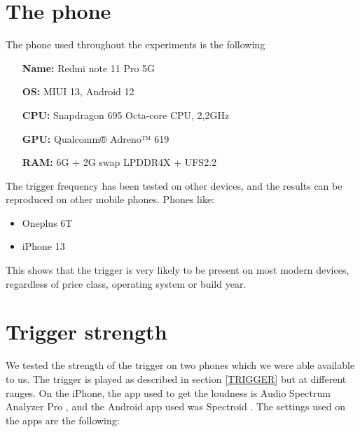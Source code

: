 \documentclass{report}
\theoremstyle{definition}
\theoremstyle{remark}
\begin{document}
\section{The phone}
The phone used throughout the experiments is the following \cite{REDMI}
\begin{center}
    \begin{varwidth}{\textwidth}
        \begin{itemize}
            \item[\textbf{Name:}] Redmi note 11 Pro 5G
            \item[\textbf{OS:}] MIUI 13, Android 12
            \item[\textbf{CPU:}] Snapdragon 695 Octa-core CPU, 2,2GHz
            \item[\textbf{GPU:}] Qualcomm® Adreno™ 619
            \item[\textbf{RAM:}] 6G + 2G swap LPDDR4X + UFS2.2
        \end{itemize}
    \end{varwidth}
\end{center}

The trigger frequency has been tested on other devices, and the results can be reproduced on other mobile phones. Phones like: 
\begin{itemize}
    \item Oneplus 6T
    \item iPhone 13
\end{itemize}

This shows that the trigger is very likely to be present on most modern devices, regardless of price class, operating system or build year.

\section{Trigger strength}
We tested the strength of the trigger on two phones which we were able available to us. The trigger is played as described in section \ref{TRIGGER} but at different ranges. On the iPhone, the app used to get the loudness is Audio Spectrum Analyzer Pro \cite{AudioSpectrum}, and the Android app used was Spectroid \cite{Spectroid}. The settings used on the apps are the following:
\end{document}
